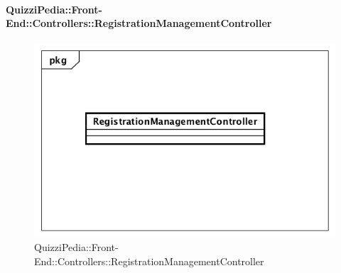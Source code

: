 \paragraph{QuizziPedia::Front-End::Controllers::RegistrationManagementController}
\begin{figure} [ht]
	\centering
	\includegraphics[scale=0.45]{UML/Classi/Front-End/QuizziPedia_Front-end_Controller_RegistrationManagementController.png}
	\caption{QuizziPedia::Front-End::Controllers::RegistrationManagementController}
\end{figure} \FloatBarrier
